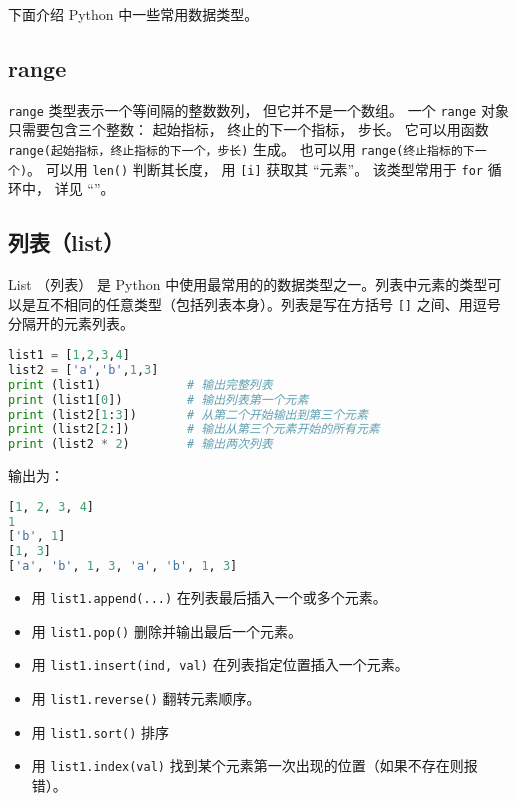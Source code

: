 

下面介绍 Python 中一些常用数据类型。 

\subsection{range}
\verb`range` 类型表示一个等间隔的整数数列， 但它并不是一个数组。 一个 \verb`range` 对象只需要包含三个整数： 起始指标， 终止的下一个指标， 步长。 它可以用函数 \verb`range(起始指标，终止指标的下一个，步长)` 生成。 也可以用 \verb`range(终止指标的下一个)`。 可以用 \verb`len()` 判断其长度， 用 \verb`[i]` 获取其 “元素”。 该类型常用于 \verb`for` 循环中， 详见 “”。

\subsection{列表（list）}
List （列表） 是 Python 中使用最常用的的数据类型之一。列表中元素的类型可以是互不相同的任意类型（包括列表本身）。列表是写在方括号 \verb`[]` 之间、用逗号分隔开的元素列表。
\begin{lstlisting}[language=python]
list1 = [1,2,3,4]
list2 = ['a','b',1,3]
print (list1)            # 输出完整列表
print (list1[0])         # 输出列表第一个元素
print (list2[1:3])       # 从第二个开始输出到第三个元素
print (list2[2:])        # 输出从第三个元素开始的所有元素
print (list2 * 2)        # 输出两次列表
\end{lstlisting}
输出为：
\begin{lstlisting}[language=python]
[1, 2, 3, 4]
1
['b', 1]
[1, 3]
['a', 'b', 1, 3, 'a', 'b', 1, 3]
\end{lstlisting}
\begin{itemize}
\item 用 \verb`list1.append(...)` 在列表最后插入一个或多个元素。
\item 用 \verb`list1.pop()` 删除并输出最后一个元素。
\item 用 \verb`list1.insert(ind, val)` 在列表指定位置插入一个元素。
\item 用 \verb`list1.reverse()` 翻转元素顺序。
\item 用 \verb`list1.sort()` 排序
\item 用 \verb`list1.index(val)` 找到某个元素第一次出现的位置（如果不存在则报错）。
\end{itemize}

